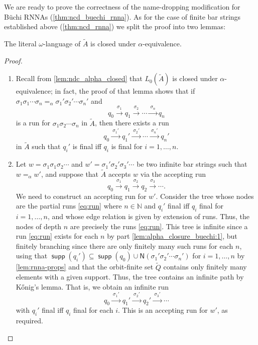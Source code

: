\documentclass[final,a4paper,UKenglish,thm-restate,autoref,numberwithinsect]{lipics-v2021}
\newcommand{\Names}[1]{\mathsf{N}(#1)}
\numberwithin{equation}{section}
\newcommand{\xto}[1]{\xrightarrow{~#1~}}
\newcommand{\seq}{\subseteq}
\newcommand{\tl}{\widetilde}
\newcommand{\Nat}{{\mathbb{N}}}
\newcommand{\+}[1]{\mathcal{#1}\xspace}
\DeclareMathOperator{\supp}{\mathsf{supp}} %
\theoremstyle{definition}
\begin{document}
We are ready to prove the correctness of the name-dropping modification for Büchi RNNAs (\autoref{thm:ncd_buechi_rnna}). As for the case of finite bar strings established above  (\autoref{thm:ncd_rnna}) we split the proof into two lemmas:
%
\begin{lemma}\label{lem:alpha_closure_buechi}
  The literal $\omega$-language of $\tl{A}$ is closed under $\alpha$-equivalence.
\end{lemma}
%
\begin{proof}
  \begin{enumerate}
  \item\label{lem:alpha_closure_buechi:1} Recall from \autoref{lem:ndc_alpha_closed} that $L_0(\tl{A})$
    is closed under $\alpha$-equivalence; in fact, the proof of that
    lemma shows that if
    $\sigma_1\sigma_1\cdots \sigma_n=_\alpha \sigma_1'\sigma_2'\cdots
    \sigma_n'$ and
    \[
      q_0\xto{\sigma_1} q_1\xto{\sigma_2} \cdots \xto{\sigma_n} q_n
    \]
    is a run for $\sigma_1\sigma_2\cdots \sigma_n$ in $\tl{A}$, then
    there exists a run
    \begin{equation}\label{eq:run}
      q_0\xto{\sigma_1'} q_1'\xto{\sigma_2'} \cdots \xto{\sigma_n'}
      q_n'
    \end{equation}
    in $\tl{A}$ such that $q_i'$ is final iff $q_i$ is final for
    $i=1,\ldots, n$.%
    
  \item Let $w=\sigma_1\sigma_1\sigma_2\cdots$ and
    $w'=\sigma_1'\sigma_2'\sigma_3'\cdots$ be two infinite bar strings
    such that $w=_\alpha w'$, and suppose that $\tl{A}$ accepts $w$
    via the accepting run
    \[
      q_0\xto{\sigma_1} q_1\xto{\sigma_2} q_2\xto{\sigma_3}\cdots.
    \]
    We need to construct an accepting run for $w'$. Consider the tree
    whose nodes are the partial runs \eqref{eq:run} where $n\in \Nat$
    and $q_i'$ final iff $q_i$ final for $i=1,\ldots, n$, and whose
    edge relation is given by extension of runs. Thus, the nodes of
    depth $n$ are precisely the runs \eqref{eq:run}. This tree is
    infinite since a run \eqref{eq:run} exists for each $n$ by
    part \ref{lem:alpha_closure_buechi:1}, but finitely branching since there are only finitely
    many such runs for each $n$, using that
    $\supp(q_i')\seq \supp(q_0)\cup \Names{\sigma_1'\sigma_2'\cdots
      \sigma_n'}$ for $i=1,\ldots,n$ by \autoref{lem:rnna-props} and that the orbit-finite set $\tl{Q}$
    contains only finitely many elements with a given support. Thus,
    the tree contains an infinite path by K\H{o}nig's lemma. That is,
    we obtain an infinite run
    \[
      q_0\xto{\sigma_1'} q_1'\xto{\sigma_2'} q_2'\xto{\sigma_3'}\cdots
    \]
    with $q_i'$ final iff $q_i$ final for each $i$. This is an
    accepting run for $w'$, as required.\qedhere
  \end{enumerate}
\end{proof}
\end{document}
